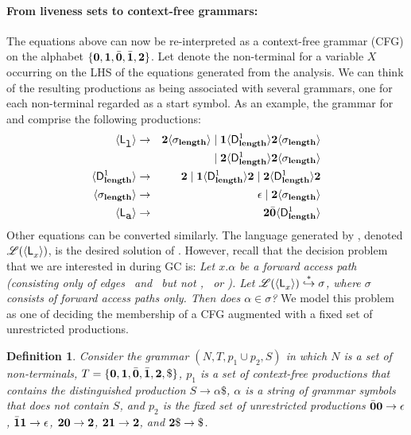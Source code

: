 \documentclass[9pt,preprint,nonatbib]{sigplanconf}
\newtheorem{definition}[theorem]{Definition}
\begin{document}
\paragraph{From liveness sets to context-free grammars:}\label{sec:grammar-formulation}      
The  equations  above can  now  be  re-interpreted as  a  context-free
grammar  (CFG) on  the  alphabet $\lbrace\mathbf{0},  \mathbf{1}, \bar{\mathbf{0}},  \bar{\mathbf{1}},
{\mathbf{2}}\rbrace$.  Let  denote  the non-terminal for a variable
$X$ occurring on the LHS of the equations generated from the analysis.
We can  think of  the resulting productions  as being  associated with
several grammars, one for  each non-terminal  regarded
as a start symbol.  As  an example, the grammar for \var{\Lanv{\xl}{}}
and \var{\Lanv{\pa}{}} comprise the following productions:
\begin{eqnarray*}
  \langle \mathsf{L}_{{\mbox{\tt l}}}^{}\rangle  &\rightarrow& 
  {\mathbf{2}}\langle \sigma_{\mathbf{length}}\rangle \mid \mathbf{1} \langle \mathsf{D}_{\mathit {\mathbf{length}}}^{1}\rangle{\ensuremath{{\mathbf{2}}}\ensuremath{\langle \sigma_{\mathbf{length}}\rangle}}  \\ && \mid
  {\mathbf{2}}\langle \mathsf{D}_{\mathit {\mathbf{length}}}^{1}\rangle{\ensuremath{{\mathbf{2}}}\ensuremath{\langle \sigma_{\mathbf{length}}\rangle}} \\
  \langle \mathsf{D}_{\mathit {\mathbf{length}}}^{1}\rangle &\rightarrow& {\mathbf{2}} \mid
  \mathbf{1}\langle \mathsf{D}_{\mathit {\mathbf{length}}}^{1}\rangle{\mathbf{2}}
       \mid {\mathbf{2}}\langle \mathsf{D}_{\mathit {\mathbf{length}}}^{1}\rangle{\ensuremath{{\mathbf{2}}}}\\
\langle {\sigma_{\ensuremath{\mathbf{length}}}} \rangle
&\rightarrow&
\epsilon  \mid {\mathbf{2}}\langle{\sigma_{\ensuremath{\mathbf{length}}}}\rangle \\
\langle \mathsf{L}_{{\mbox{\tt a}}}^{}\rangle &\rightarrow& {\mathbf{2}} \bar{\mathbf{0}} \langle \mathsf{D}_{\mathit {\mathbf{length}}}^{1}\rangle
\end{eqnarray*}
Other  equations  can   be  converted  similarly.   The
language   generated   by  ,   denoted
$\mathscr{L}(\langle \mathsf{L}_{{x}}^{}\rangle)$,   is    the   desired
solution  of  .    
However, recall that the decision problem that we are interested in
during GC is: 
{\em
Let $x.\alpha$ be a forward access path (consisting only
of edges  \acar\ and \acdr\  but not \bcar,  \bcdr\ or
\clazy).       Let      $\mathscr{L}(\langle \mathsf{L}_{{x}}^{}\rangle)
\stackrel{*}{\hookrightarrow}  \sigma$, where  $\sigma$
consists  of  forward  access  paths  only.  Then  does
$\alpha \in \sigma$?
}
We model  this problem as one  of deciding the
membership of  a CFG augmented  with a
fixed set of unrestricted productions.

\begin{definition}\label{def:specialgrammar}
Consider the  grammar $(N,T,  p_1\cup p_2,S)$  in which
$N$ is  a set  of non-terminals,  $T =  \{\mathbf{0}, \mathbf{1},
\bar{\mathbf{0}},  \bar{\mathbf{1}},  {\mathbf{2}},  \$\}$,   $p_1$  is  a  set  of
context-free    productions     that    contains    the
distinguished  production   $S  \rightarrow  \alpha\$$,
$\alpha$ is a  string of grammar symbols  that does not
contain $S$, and $p_2$ is the fixed set of unrestricted
productions    $\bar{\mathbf{0}}\mathbf{0}    \rightarrow    \epsilon$,
$\bar{\mathbf{1}}\mathbf{1}    \rightarrow   \epsilon$,    ${\mathbf{2}}\mathbf{0}
\rightarrow {\mathbf{2}}$,  ${\mathbf{2}}\mathbf{1} \rightarrow {\mathbf{2}}$,
and $\clazy\$ \rightarrow \$ $.
\end{definition}
\end{document}
